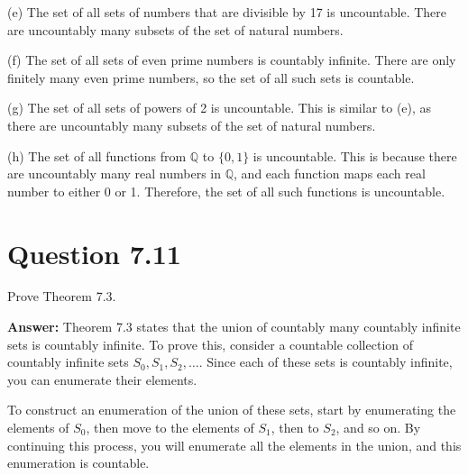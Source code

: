 \documentclass{article}
\begin{document}
(e) The set of all sets of numbers that are divisible by 17 is uncountable. There are uncountably many subsets of the set of natural numbers.

(f) The set of all sets of even prime numbers is countably infinite. There are only finitely many even prime numbers, so the set of all such sets is countable.

(g) The set of all sets of powers of 2 is uncountable. This is similar to (e), as there are uncountably many subsets of the set of natural numbers.

(h) The set of all functions from $\mathbb{Q}$ to $\{0, 1\}$ is uncountable. This is because there are uncountably many real numbers in $\mathbb{Q}$, and each function maps each real number to either 0 or 1. Therefore, the set of all such functions is uncountable.

\section*{Question 7.11}
Prove Theorem 7.3.

\textbf{Answer:} Theorem 7.3 states that the union of countably many countably infinite sets is countably infinite. To prove this, consider a countable collection of countably infinite sets $S_0, S_1, S_2, \ldots$. Since each of these sets is countably infinite, you can enumerate their elements.

To construct an enumeration of the union of these sets, start by enumerating the elements of $S_0$, then move to the elements of $S_1$, then to $S_2$, and so on. By continuing this process, you will enumerate all the elements in the union, and this enumeration is countable.
\end{document}
